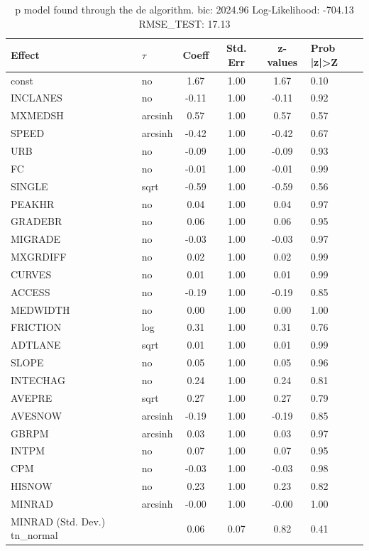 \begin{table}
	\caption{p model found through the de algorithm. bic: 2024.96 Log-Likelihood: -704.13 RMSE_TEST: 17.13}
	\begin{center}
		\begin{tabular}{|l|l|c|c|c|l|}
			\hline
			Effect & $\tau$ & Coeff & Std. Err & z-values & Prob |z|>Z \\
			\hline
			const & no & 1.67 & 1.00 & 1.67 & 0.10 \\
			\hline
			INCLANES & no & -0.11 & 1.00 & -0.11 & 0.92 \\
			\hline
			MXMEDSH & arcsinh & 0.57 & 1.00 & 0.57 & 0.57 \\
			\hline
			SPEED & arcsinh & -0.42 & 1.00 & -0.42 & 0.67 \\
			\hline
			URB & no & -0.09 & 1.00 & -0.09 & 0.93 \\
			\hline
			FC & no & -0.01 & 1.00 & -0.01 & 0.99 \\
			\hline
			SINGLE & sqrt & -0.59 & 1.00 & -0.59 & 0.56 \\
			\hline
			PEAKHR & no & 0.04 & 1.00 & 0.04 & 0.97 \\
			\hline
			GRADEBR & no & 0.06 & 1.00 & 0.06 & 0.95 \\
			\hline
			MIGRADE & no & -0.03 & 1.00 & -0.03 & 0.97 \\
			\hline
			MXGRDIFF & no & 0.02 & 1.00 & 0.02 & 0.99 \\
			\hline
			CURVES & no & 0.01 & 1.00 & 0.01 & 0.99 \\
			\hline
			ACCESS & no & -0.19 & 1.00 & -0.19 & 0.85 \\
			\hline
			MEDWIDTH & no & 0.00 & 1.00 & 0.00 & 1.00 \\
			\hline
			FRICTION & log & 0.31 & 1.00 & 0.31 & 0.76 \\
			\hline
			ADTLANE & sqrt & 0.01 & 1.00 & 0.01 & 0.99 \\
			\hline
			SLOPE & no & 0.05 & 1.00 & 0.05 & 0.96 \\
			\hline
			INTECHAG & no & 0.24 & 1.00 & 0.24 & 0.81 \\
			\hline
			AVEPRE & sqrt & 0.27 & 1.00 & 0.27 & 0.79 \\
			\hline
			AVESNOW & arcsinh & -0.19 & 1.00 & -0.19 & 0.85 \\
			\hline
			GBRPM & arcsinh & 0.03 & 1.00 & 0.03 & 0.97 \\
			\hline
			INTPM & no & 0.07 & 1.00 & 0.07 & 0.95 \\
			\hline
			CPM & no & -0.03 & 1.00 & -0.03 & 0.98 \\
			\hline
			HISNOW & no & 0.23 & 1.00 & 0.23 & 0.82 \\
			\hline
			MINRAD & arcsinh & -0.00 & 1.00 & -0.00 & 1.00 \\
			\hline
			MINRAD (Std. Dev.) tn_normal &  & 0.06 & 0.07 & 0.82 & 0.41 \\
			\hline
		\end{tabular}
	\end{center}
\end{table}